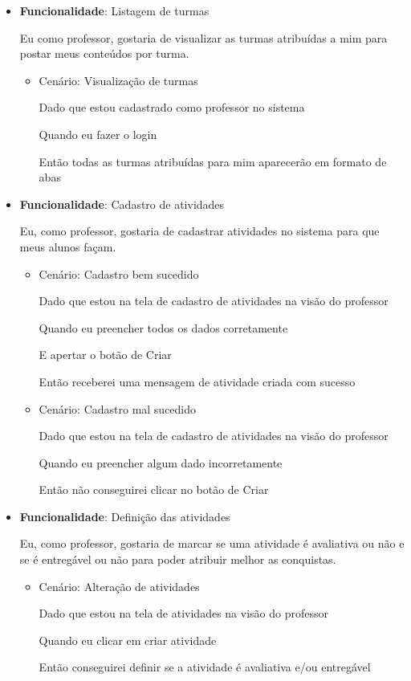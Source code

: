 \begin{itemize}
\item\textbf{Funcionalidade}: Listagem de turmas
    
    Eu como professor, gostaria de visualizar as turmas atribuídas a mim para postar meus conteúdos por turma.
    \begin{itemize}
        \item Cenário: Visualização de turmas 
        \par Dado que estou cadastrado como professor no sistema
        \par Quando eu fazer o login
        \par Então todas as turmas atribuídas para mim aparecerão em formato de abas
    \end{itemize}  

\item\textbf{Funcionalidade}: Cadastro de atividades
    
    Eu, como professor, gostaria de cadastrar atividades no sistema para que meus alunos façam.
    \begin{itemize}
        \item Cenário: Cadastro bem sucedido  
        \par Dado que estou na tela de cadastro de atividades na visão do professor
        \par Quando eu preencher todos os dados corretamente
        \par E apertar o botão de Criar
        \par Então receberei uma mensagem de atividade criada com sucesso
    \end{itemize}   
    \begin{itemize}
        \item Cenário: Cadastro mal sucedido  
        \par Dado que estou na tela de cadastro de atividades na visão do professor
        \par Quando eu preencher algum dado incorretamente
        \par Então não conseguirei clicar no botão de Criar
    \end{itemize}   

\item\textbf{Funcionalidade}: Definição das atividades
    
    Eu, como professor, gostaria de marcar se uma atividade é avaliativa ou não e se é entregável ou não para poder atribuir melhor as conquistas.
    \begin{itemize}
        \item Cenário: Alteração de atividades  
        \par Dado que estou na tela de atividades na visão do professor
        \par Quando eu clicar em criar atividade 
        \par Então conseguirei definir se a atividade é avaliativa e/ou entregável
    \end{itemize}


\end{itemize}
